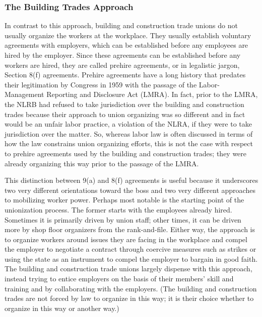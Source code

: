 \subsubsection{The Building Trades Approach}

In contrast to this approach, building and construction trade unions do not usually organize the workers at the workplace. They usually establish voluntary agreements with employers, which can be established before any employees are hired by the employer. Since these agreements can be established before any workers are hired, they are called prehire agreements, or in legalistic jargon, Section 8(f) agreements. Prehire agreements have a long history that predates their legitimation by Congress in 1959 with the passage of the Labor-Management Reporting and Disclosure Act (LMRA). In fact, prior to the LMRA, the NLRB had refused to take jurisdiction over the building and construction trades because their approach to union organizing was so different and in fact would be an unfair labor practice, a violation of the NLRA, if they were to take jurisdiction over the matter. So, whereas labor law is often discussed in terms of how the law constrains union organizing efforts, this is not the case with respect to prehire agreements used by the building and construction trades; they were already organizing this way prior to the passage of the LMRA.

This distinction between 9(a) and 8(f) agreements is useful because it underscores two very different orientations toward the boss and two very different approaches to mobilizing worker power. Perhaps most notable is the starting point of the unionization process. The former starts with the employees already hired. Sometimes it is primarily driven by union staff; other times, it can be driven more by shop floor organizers from the rank-and-file. Either way, the approach is to organize workers around issues they are facing in the workplace and compel the employer to negotiate a contract through coercive measures such as strikes or using the state as an instrument to compel the employer to bargain in good faith. The building and construction trade unions largely dispense with this approach, instead trying to entice employers on the basis of their members’ skill and training and by collaborating with the employers. (The building and construction trades are not forced by law to organize in this way; it is their choice whether to organize in this way or another way.)

